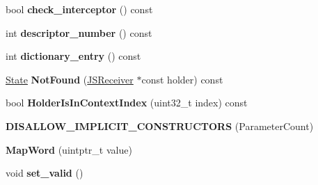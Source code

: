 \begin{DoxyCompactItemize}
\item 
bool {\bfseries check\+\_\+interceptor} () const \hypertarget{classv8_1_1internal_1_1_b_a_s_e___e_m_b_e_d_d_e_d_ad12ac0d8390b8c8282cbe15ba4e1672c}{}\label{classv8_1_1internal_1_1_b_a_s_e___e_m_b_e_d_d_e_d_ad12ac0d8390b8c8282cbe15ba4e1672c}

\item 
int {\bfseries descriptor\+\_\+number} () const \hypertarget{classv8_1_1internal_1_1_b_a_s_e___e_m_b_e_d_d_e_d_a1275d28c4780ebde2d0b81ce79a8e1f5}{}\label{classv8_1_1internal_1_1_b_a_s_e___e_m_b_e_d_d_e_d_a1275d28c4780ebde2d0b81ce79a8e1f5}

\item 
int {\bfseries dictionary\+\_\+entry} () const \hypertarget{classv8_1_1internal_1_1_b_a_s_e___e_m_b_e_d_d_e_d_a87d32ca5fd5a7632e4e0993c9d359c6b}{}\label{classv8_1_1internal_1_1_b_a_s_e___e_m_b_e_d_d_e_d_a87d32ca5fd5a7632e4e0993c9d359c6b}

\item 
\hyperlink{structv8_1_1internal_1_1_b_a_s_e___e_m_b_e_d_d_e_d_1_1_state}{State} {\bfseries Not\+Found} (\hyperlink{classv8_1_1internal_1_1_j_s_receiver}{J\+S\+Receiver} $\ast$const holder) const \hypertarget{classv8_1_1internal_1_1_b_a_s_e___e_m_b_e_d_d_e_d_abfd2a85f031b7d912068dd5cfd440f20}{}\label{classv8_1_1internal_1_1_b_a_s_e___e_m_b_e_d_d_e_d_abfd2a85f031b7d912068dd5cfd440f20}

\item 
bool {\bfseries Holder\+Is\+In\+Context\+Index} (uint32\+\_\+t index) const \hypertarget{classv8_1_1internal_1_1_b_a_s_e___e_m_b_e_d_d_e_d_a2e29f4b700961eab1fa1fb057cb82a18}{}\label{classv8_1_1internal_1_1_b_a_s_e___e_m_b_e_d_d_e_d_a2e29f4b700961eab1fa1fb057cb82a18}

\item 
{\bfseries D\+I\+S\+A\+L\+L\+O\+W\+\_\+\+I\+M\+P\+L\+I\+C\+I\+T\+\_\+\+C\+O\+N\+S\+T\+R\+U\+C\+T\+O\+RS} (Parameter\+Count)\hypertarget{classv8_1_1internal_1_1_b_a_s_e___e_m_b_e_d_d_e_d_adc3e088eab86d7785ae6b52872630101}{}\label{classv8_1_1internal_1_1_b_a_s_e___e_m_b_e_d_d_e_d_adc3e088eab86d7785ae6b52872630101}

\item 
{\bfseries Map\+Word} (uintptr\+\_\+t value)\hypertarget{classv8_1_1internal_1_1_b_a_s_e___e_m_b_e_d_d_e_d_ac907d04e1a82d67b65d2683e4401434e}{}\label{classv8_1_1internal_1_1_b_a_s_e___e_m_b_e_d_d_e_d_ac907d04e1a82d67b65d2683e4401434e}

\item 
void {\bfseries set\+\_\+valid} ()\hypertarget{classv8_1_1internal_1_1_b_a_s_e___e_m_b_e_d_d_e_d_a0b9bbcb8bcf08cbed6d0354585ee4a60}{}\label{classv8_1_1internal_1_1_b_a_s_e___e_m_b_e_d_d_e_d_a0b9bbcb8bcf08cbed6d0354585ee4a60}


\end{DoxyCompactItemize}

